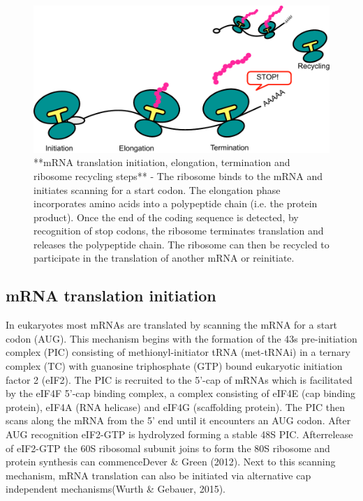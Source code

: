 \documentclass[
  12pt,
  openany]{book}
\begin{document}
\begin{figure}
  \includegraphics{./figures/doodleTranslation.pdf}
  \caption{**mRNA translation initiation, elongation, termination and ribosome recycling steps** - The ribosome binds to the mRNA and initiates scanning for a start codon. The elongation phase incorporates amino acids into a polypeptide chain (i.e. the protein product). Once the end of the coding sequence is detected, by recognition of stop codons, the ribosome terminates translation and releases the polypeptide chain. The ribosome can then be recycled to participate in the translation of another mRNA or reinitiate. \label{fig:doodlemRNASteps}}
\end{figure}
\clearpage
\subsection{mRNA translation initiation}

In eukaryotes most mRNAs are translated by scanning the mRNA for a start codon (AUG). This mechanism begins with the formation of the 43s pre-initiation complex (PIC) consisting of methionyl-initiator tRNA (met-tRNAi) in a ternary complex (TC) with guanosine triphosphate (GTP) bound eukaryotic initiation factor 2 (eIF2). The PIC is recruited to the 5'-cap of mRNAs which is facilitated by the eIF4F 5'-cap binding complex, a complex consisting of eIF4E (cap binding protein), eIF4A (RNA helicase) and eIF4G (scaffolding protein). The PIC then scans along the mRNA from the 5' end until it encounters an AUG codon. After AUG recognition eIF2-GTP is hydrolyzed forming a stable 48S PIC. Afterrelease of eIF2-GTP the 60S ribosomal subunit joins to form the 80S ribosome and protein synthesis can commenceDever \& Green (2012). Next to this scanning mechanism, mRNA translation can also be initiated via alternative cap independent mechanisms(Wurth \& Gebauer, 2015).
\end{document}
